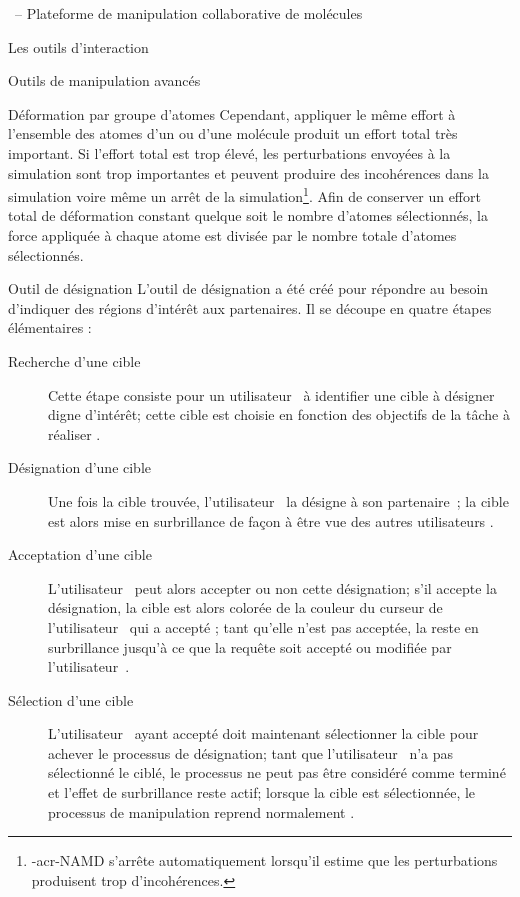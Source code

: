 \documentclass[myfrancais,ngerman,english,frenchb]{mythesis}
\begin{document}
\begin{mychapter}{\myShaddock\ -- Plateforme de manipulation collaborative de molécules}
\begin{mysection}{Les outils d'interaction}
\begin{mysubsection}{Outils de manipulation avancés}
\begin{mysubsubsection}{Déformation par groupe d'atomes}
					Cependant, appliquer le même effort à l'ensemble des atomes d'un  ou d'une molécule produit un effort total très important.
					Si l'effort total est trop élevé, les perturbations envoyées à la simulation sont trop importantes et peuvent produire des incohérences dans la simulation voire même un arrêt de la simulation\footnote{\myacro-{acr-NAMD} s'arrête automatiquement lorsqu'il estime que les perturbations produisent trop d'incohérences.}.
					Afin de conserver un effort total de déformation constant quelque soit le nombre d'atomes sélectionnés, la force appliquée à chaque atome est divisée par le nombre totale d'atomes sélectionnés.
				\end{mysubsubsection}
				\begin{mysubsubsection}{Outil de désignation}
					L'outil de désignation a été créé pour répondre au besoin d'indiquer des régions d'intérêt aux partenaires.
					Il se découpe en quatre étapes élémentaires :
					\begin{description}
						\item[Recherche d'une cible] Cette étape consiste pour un utilisateur~ à identifier une cible à désigner digne d'intérêt;
							cette cible est choisie en fonction des objectifs de la tâche à réaliser .
						\item[Désignation d'une cible] Une fois la cible trouvée, l'utilisateur~ la désigne à son partenaire~;
							la cible est alors mise en surbrillance de façon à être vue des autres utilisateurs .
						\item[Acceptation d'une cible] L'utilisateur~ peut alors accepter ou non cette désignation;
							s'il accepte la désignation, la cible est alors colorée de la couleur du curseur de l'utilisateur~ qui a accepté ;
							tant qu'elle n'est pas acceptée, la  reste en surbrillance jusqu'à ce que la requête soit accepté ou modifiée par l'utilisateur~.
						\item[Sélection d'une cible] L'utilisateur~ ayant accepté doit maintenant sélectionner la cible pour achever le processus de désignation;
							tant que l'utilisateur~ n'a pas sélectionné le  ciblé, le processus ne peut pas être considéré comme terminé et l'effet de surbrillance reste actif;
							lorsque la cible est sélectionnée, le processus de manipulation reprend normalement .
					\end{description}


\end{mysubsubsection}
\end{mysubsection}
\end{mysection}
\end{mychapter}
\end{document}
